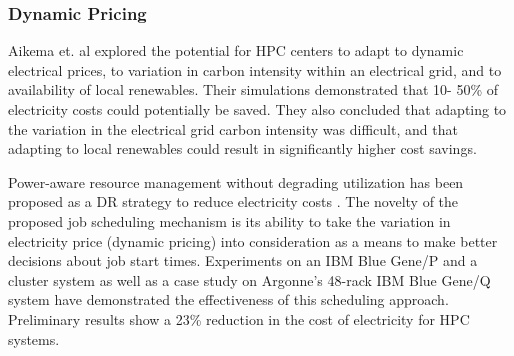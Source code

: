 \subsubsection{Dynamic Pricing}
Aikema et. al \cite{aikema_electrical_2011} explored the potential for HPC
centers to adapt to dynamic electrical prices, to variation in carbon intensity
within an electrical grid, and to availability of local renewables. Their
simulations demonstrated that 10- 50\% of electricity costs could potentially
be saved. They also concluded that adapting to the variation in the electrical
grid carbon intensity was difficult, and that adapting to local renewables could
result in significantly higher cost savings.

Power-aware resource management without degrading utilization has been proposed
as a DR strategy to reduce electricity costs
\cite{yang_integrating_2013,zhou_reducing_2013}. The novelty of the proposed job
scheduling mechanism is its ability to take the variation in electricity price
(dynamic pricing) into consideration as a means to make better decisions about
job start times. Experiments on an IBM Blue Gene/P and a cluster system as well
as a case study on Argonne's 48-rack IBM Blue Gene/Q system have demonstrated
the effectiveness of this scheduling approach. Preliminary results show a 23\%
reduction in the cost of electricity for HPC systems.